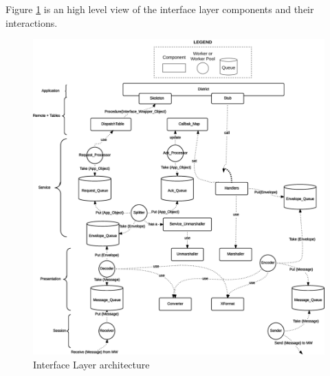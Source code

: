 Figure \ref{fig:impl-il-arch} is an high level view of
the interface layer components and their interactions.

\begin{figure}[H]
  \centering
  \includegraphics[width=\columnwidth]{images/implementation/il-overall.eps}
  \caption{Interface Layer architecture}
  \label{fig:impl-il-arch}
\end{figure}

